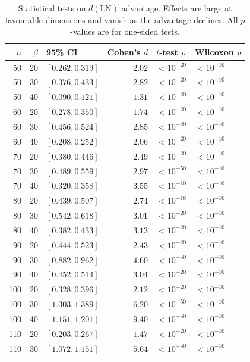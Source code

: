 \documentclass[journal=cic,version=preprint]{iacrj}
\begin{document}
\begin{table}[tbp]
\centering
\caption{Statistical tests on $d(\mathrm{LN})$ advantage. Effects are large at favourable dimensions and vanish as the advantage declines. All $p$-values are for one-sided tests.\label{tab:stats}}
\small
\begin{tabular}{rrlrll}
\hline
$n$ & $\beta$ & 95\% CI & Cohen's $d$ & $t$-test $p$ & Wilcoxon $p$ \\
\hline
50  & 20 & $[0.262, 0.319]$ & $2.02$  & $<10^{-20}$ & $<10^{-10}$ \\
50  & 30 & $[0.376, 0.433]$ & $2.82$  & $<10^{-20}$ & $<10^{-10}$ \\
50  & 40 & $[0.090, 0.121]$ & $1.31$  & $<10^{-20}$ & $<10^{-10}$ \\
60  & 20 & $[0.278, 0.350]$ & $1.74$  & $<10^{-20}$ & $<10^{-10}$ \\
60  & 30 & $[0.456, 0.524]$ & $2.85$  & $<10^{-20}$ & $<10^{-10}$ \\
60  & 40 & $[0.208, 0.252]$ & $2.06$  & $<10^{-20}$ & $<10^{-10}$ \\
70  & 20 & $[0.380, 0.446]$ & $2.49$  & $<10^{-20}$ & $<10^{-10}$ \\
70  & 30 & $[0.489, 0.559]$ & $2.97$  & $<10^{-50}$ & $<10^{-10}$ \\
70  & 40 & $[0.320, 0.358]$ & $3.55$  & $<10^{-10}$ & $<10^{-10}$ \\
80  & 20 & $[0.439, 0.507]$ & $2.74$  & $<10^{-18}$ & $<10^{-10}$ \\
80  & 30 & $[0.542, 0.618]$ & $3.01$  & $<10^{-20}$ & $<10^{-10}$ \\
80  & 40 & $[0.382, 0.433]$ & $3.13$  & $<10^{-20}$ & $<10^{-10}$ \\
90  & 20 & $[0.444, 0.523]$ & $2.43$  & $<10^{-20}$ & $<10^{-10}$ \\
90  & 30 & $[0.882, 0.962]$ & $4.60$  & $<10^{-50}$ & $<10^{-10}$ \\
90  & 40 & $[0.452, 0.514]$ & $3.04$  & $<10^{-20}$ & $<10^{-10}$ \\
100 & 20 & $[0.328, 0.396]$ & $2.12$  & $<10^{-20}$ & $<10^{-10}$ \\
100 & 30 & $[1.303, 1.389]$ & $6.20$  & $<10^{-50}$ & $<10^{-10}$ \\
100 & 40 & $[1.151, 1.201]$ & $9.40$  & $<10^{-50}$ & $<10^{-10}$ \\
110 & 20 & $[0.203, 0.267]$ & $1.47$  & $<10^{-20}$ & $<10^{-10}$ \\
110 & 30 & $[1.072, 1.151]$ & $5.64$  & $<10^{-50}$ & $<10^{-10}$ \\

\end{tabular}
\end{table}
\end{document}

